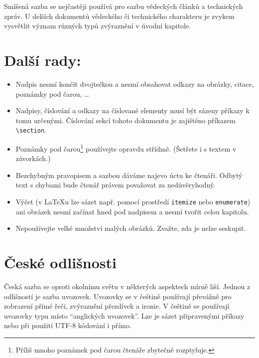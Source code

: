 \documentclass[twocolumn, 10pt, a4paper]{article} %
\begin{document}
    Smíšená sazba se nejčastěji používá pro sazbu vědeckých článků a technických zpráv.
    U delších dokumentů vědeckého či technického charakteru je zvykem vysvětlit význam různých typů zvýraznění v úvodní kapitole.


\section{Další rady:}
    \begin{itemize}
        \item Nadpis nesmí končit dvojtečkou a nesmí obsahovat odkazy na obrázky, citace, poznámky pod čarou, \dots
        
        \item Nadpisy, číslování a odkazy na číslované elementy musí být sázeny příkazy k tomu určenými. Číslování sekcí tohoto dokumentu je zajištěno příkazem \verb|\section|.
    
        \item Poznámky pod čarou\footnote{Příliš mnoho poznámek pod čarou čtenáře zbytečně rozptyluje.} používejte opravdu střídmě.
        (Šetřete i s textem v závorkách.)
    
        \item Bezchybným pravopisem a sazbou dáváme najevo úctu ke čtenáři. Odbytý text s chybami bude čtenář právem považovat za nedůvěryhodný.
    
        \item Výčet (v \LaTeX  u lze sázet např. pomocí prostředí \texttt{itemize} nebo \texttt{enumerate}) ani obrázek nesmí začínat hned pod nadpisem a nesmí tvořit celou kapitolu.
    
        \item Nepoužívejte velké množství malých obrázků. Zvažte, zda je nelze seskupit.
    
    \end{itemize}

\section{České odlišnosti}

    Česká sazba se oproti okolnímu světu v některých aspektech mírně liší.
    Jednou z odlišností je sazba uvozovek.
    Uvozovky se v češtině používají převážně pro zobrazení přímé řeči, zvýraznění přezdívek a ironie.
    V češtině se používají uvozovky typu  místo ``anglických uvozovek''.
    Lze je sázet připravenými příkazy nebo při použití UTF-8 kódování i přímo.
    \par
    
\end{document}
